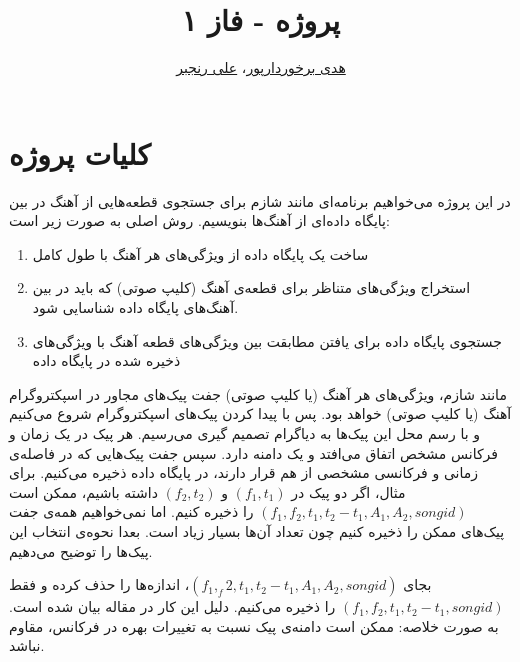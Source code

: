 \documentclass{utsignal}
\title{پروژه - فاز ۱}
\author{\href{mailto:h.barkhordarpour@ut.ac.ir?subject=[SS\%20S98 A2]}{هدی برخوردارپور}، 
\href{mailto:ranjbar.ali@ut.ac.ir?subject=[SS\%20S98 A2]\%20}{علی رنجبر}}
\begin{document}
	\maketitle
	\section*{کلیات پروژه}
	در این پروژه می‌خواهیم برنامه‌ای مانند شازم برای جستجوی قطعه‌هایی از آهنگ در بین پایگاه داده‌ای از آهنگ‌ها بنویسیم. روش اصلی به صورت زیر است:
	\begin{enumerate}
		\item ساخت یک پایگاه داده از ویژگی‌های هر آهنگ با طول کامل
		\item استخراج ویژگی‌های متناظر برای قطعه‌ی آهنگ (کلیپ صوتی) که باید در بین آهنگ‌های پایگاه داده شناسایی شود.
		\item جستجوی پایگاه داده برای یافتن مطابقت بین ویژگی‌‌های قطعه آهنگ با ویژگی‌های ذخیره شده در پایگاه داده
	\end{enumerate}
	مانند شازم، ویژگی‌های هر آهنگ (یا کلیپ صوتی) جفت پیک‌های مجاور در اسپکتروگرام آهنگ (یا کلیپ صوتی) خواهد بود. پس با پیدا کردن پیک‌های اسپکتروگرام شروع می‌کنیم و با رسم محل این پیک‌ها به دیاگرام تصمیم گیری  می‌رسیم. هر پیک در یک زمان و فرکانس مشخص	  اتفاق می‌افتد و یک دامنه  دارد. سپس جفت پیک‌هایی که در فاصله‌ی زمانی و فرکانسی مشخصی از هم قرار دارند، در پایگاه داده ذخیره می‌کنیم. برای مثال، اگر دو پیک در $(f_1, t_1)$ و $(f_2, t_2)$ داشته باشیم، ممکن است $(f_1, f_2, t_1, t_2-t_1,A_1,A_2,songid)$ را ذخیره کنیم. اما نمی‌خواهیم همه‌ی جفت پیک‌های ممکن را ذخیره کنیم چون تعداد آن‌ها بسیار زیاد است. بعدا نحوه‌ی انتخاب این پیک‌ها را توضیح می‌دهیم.
	
	بجای $(f_1, _f2, t_1, t_2-t_1,A_1,A_2,songid)$، اندازه‌ها را حذف کرده و فقط $(f_1, f_2, t_1, t_2-t_1,songid)$ را ذخیره می‌کنیم. دلیل این کار در مقاله بیان شده است. به صورت خلاصه: ممکن است دامنه‌ی پیک نسبت به تغییرات بهره در فرکانس، مقاوم نباشد.
	
\end{document}
